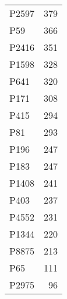 \begin{tabular}{lr}
   P2597 &                          379 \\
     P59 &                          366 \\
   P2416 &                          351 \\
   P1598 &                          328 \\
    P641 &                          320 \\
    P171 &                          308 \\
    P415 &                          294 \\
     P81 &                          293 \\
    P196 &                          247 \\
    P183 &                          247 \\
   P1408 &                          241 \\
    P403 &                          237 \\
   P4552 &                          231 \\
   P1344 &                          220 \\
   P8875 &                          213 \\
     P65 &                          111 \\
   P2975 &                           96 \\
\bottomrule
\end{tabular}
